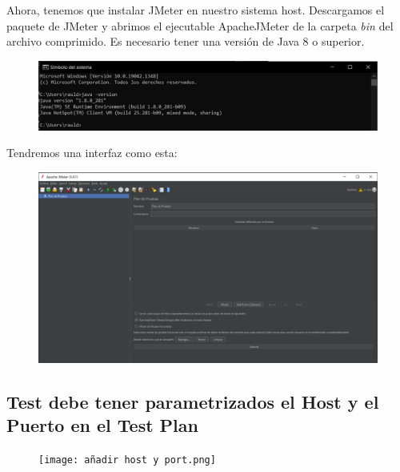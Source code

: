 \documentclass[a4paper]{article}
\begin{document}
\newpage
Ahora, tenemos que instalar JMeter en nuestro sistema host.
Descargamos el paquete de JMeter y abrimos el ejecutable ApacheJMeter de la carpeta \textsl{bin} del 
archivo comprimido. Es necesario tener una versión de Java 8 o superior.
\begin{figure}[hbt!]
    \centering
    \includegraphics[width=\textwidth]{version java.png}
\end{figure}
\newline Tendremos una interfaz como esta:
\begin{figure}[hbt!]
    \centering
    \includegraphics[width=\textwidth]{interfaz apache jmeter.png}
\end{figure}
\subsection{Test debe tener parametrizados el Host y el Puerto en el Test Plan}
\begin{figure}[hbt!]
    \centering
    \texttt{[image: añadir host y port.png]}
\end{figure}
\newpage
\end{document}
